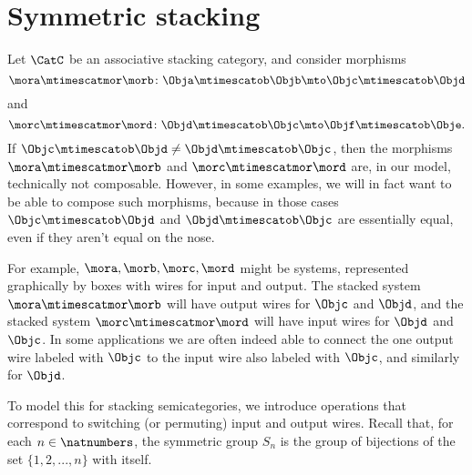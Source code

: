 
\section{Symmetric stacking}

Let $\CatC$ be an associative stacking category, and consider morphisms
\begin{equation*}
\mora \mtimescatmor \morb \colon \Obja \mtimescatob \Objb \mto \Objc \mtimescatob \Objd
\end{equation*}
and~
\begin{equation*}
\morc \mtimescatmor \mord \colon \Objd \mtimescatob \Objc \mto \Objf \mtimescatob \Obje.
\end{equation*}
If $\Objc \mtimescatob \Objd \neq \Objd \mtimescatob \Objc$, then the morphisms $\mora \mtimescatmor \morb$ and $\morc \mtimescatmor \mord$ are, in our model, technically not composable. However, in some examples, we will in fact want to be able to compose such morphisms, because in those cases $\Objc \mtimescatob \Objd$ and $\Objd \mtimescatob \Objc$ are essentially equal, even if they aren't equal on the nose.

For example, $\mora, \morb, \morc, \mord$ might be systems, represented graphically by boxes with wires for input and output. The stacked system $\mora \mtimescatmor \morb$ will have output wires for $\Objc$ and $\Objd$, and the stacked system $\morc \mtimescatmor \mord$ will have input wires for $\Objd$ and $\Objc$. In some applications we are often indeed able to connect the one output wire labeled with $\Objc$ to the input wire also labeled with $\Objc$, and similarly for $\Objd$.

To model this for stacking semicategories, we introduce operations that correspond to switching (or permuting) input and output wires. Recall that, for each $n \in \natnumbers$, the symmetric group $S_n$ is the group of bijections of the set $\{1, 2, ..., n \}$ with itself.



